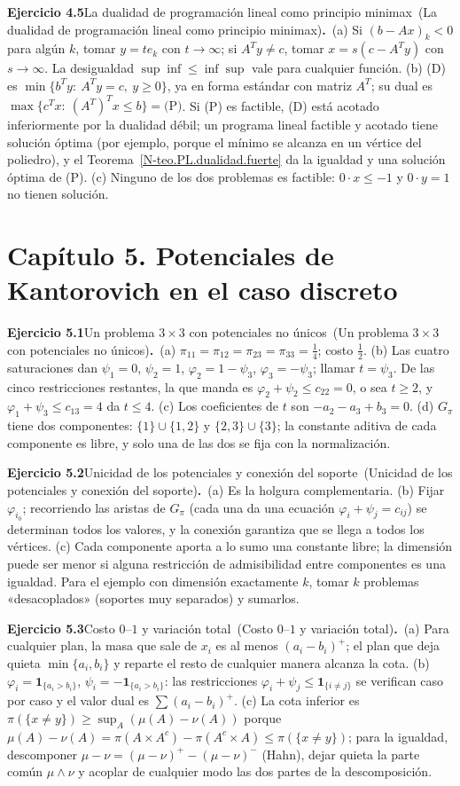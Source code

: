 \documentclass[11pt,a4paper]{amsart}
\newcommand{\I}{{\mathbf 1}}
\theoremstyle{remark}
\theoremstyle{definition}
\numberwithin{subsection}{section}
\numberwithin{equation}{section}
\newcommand{\ejlabel}[2]{\par\medskip\noindent\textbf{Ejercicio #1}\ifx\relax#2\relax\else\ (#2)\fi\textbf{.}\ }
\begin{document}
\ejlabel{4.5}{La dualidad de programación lineal como principio minimax}(a) Si $(b-Ax)_k<0$ para algún $k$, tomar $y=te_k$ con $t\to\infty$; si $A^Ty\ne c$, tomar $x=s(c-A^Ty)$ con $s\to\infty$. La desigualdad $\sup\inf\le\inf\sup$ vale para cualquier función. (b) (D) es $\min\{b^Ty:\ A^Ty=c,\ y\ge0\}$, ya en forma estándar con matriz $A^T$; su dual es $\max\{c^Tx:\ (A^T)^Tx\le b\}=\text{(P)}$. Si (P) es factible, (D) está acotado inferiormente por la dualidad débil; un programa lineal factible y acotado tiene solución óptima (por ejemplo, porque el mínimo se alcanza en un vértice del poliedro), y el Teorema~\ref{N-teo.PL.dualidad.fuerte} da la igualdad y una solución óptima de (P). (c) Ninguno de los dos problemas es factible: $0\cdot x\le-1$ y $0\cdot y=1$ no tienen solución.

\section*{Capítulo 5. Potenciales de Kantorovich en el caso discreto}
\ejlabel{5.1}{Un problema $3\times3$ con potenciales no únicos}(a) $\pi_{11}=\pi_{12}=\pi_{23}=\pi_{33}=\tfrac14$; costo $\tfrac12$. (b) Las cuatro saturaciones dan $\psi_1=0$, $\psi_2=1$, $\varphi_2=1-\psi_3$, $\varphi_3=-\psi_3$; llamar $t=\psi_3$. De las cinco restricciones restantes, la que manda es $\varphi_2+\psi_2\le c_{22}=0$, o sea $t\ge2$, y $\varphi_1+\psi_3\le c_{13}=4$ da $t\le4$. (c) Los coeficientes de $t$ son $-a_2-a_3+b_3=0$. (d) $G_\pi$ tiene dos componentes: $\{1\}\cup\{1,2\}$ y $\{2,3\}\cup\{3\}$; la constante aditiva de cada componente es libre, y solo una de las dos se fija con la normalización.

\ejlabel{5.2}{Unicidad de los potenciales y conexión del soporte}(a) Es la holgura complementaria. (b) Fijar $\varphi_{i_0}$; recorriendo las aristas de $G_\pi$ (cada una da una ecuación $\varphi_i+\psi_j=c_{ij}$) se determinan todos los valores, y la conexión garantiza que se llega a todos los vértices. (c) Cada componente aporta a lo sumo una constante libre; la dimensión puede ser menor si alguna restricción de admisibilidad entre componentes es una igualdad. Para el ejemplo con dimensión exactamente $k$, tomar $k$ problemas «desacoplados» (soportes muy separados) y sumarlos.

\ejlabel{5.3}{Costo $0$--$1$ y variación total}(a) Para cualquier plan, la masa que sale de $x_i$ es al menos $(a_i-b_i)^+$; el plan que deja quieta $\min\{a_i,b_i\}$ y reparte el resto de cualquier manera alcanza la cota. (b) $\varphi_i=\I_{\{a_i>b_i\}}$, $\psi_i=-\I_{\{a_i>b_i\}}$: las restricciones $\varphi_i+\psi_j\le\I_{\{i\ne j\}}$ se verifican caso por caso y el valor dual es $\sum(a_i-b_i)^+$. (c) La cota inferior es $\pi(\{x\ne y\})\ge\sup_A(\mu(A)-\nu(A))$ porque $\mu(A)-\nu(A)=\pi(A\times A^c)-\pi(A^c\times A)\le\pi(\{x\ne y\})$; para la igualdad, descomponer $\mu-\nu=(\mu-\nu)^+-(\mu-\nu)^-$ (Hahn), dejar quieta la parte común $\mu\wedge\nu$ y acoplar de cualquier modo las dos partes de la descomposición.
\end{document}
